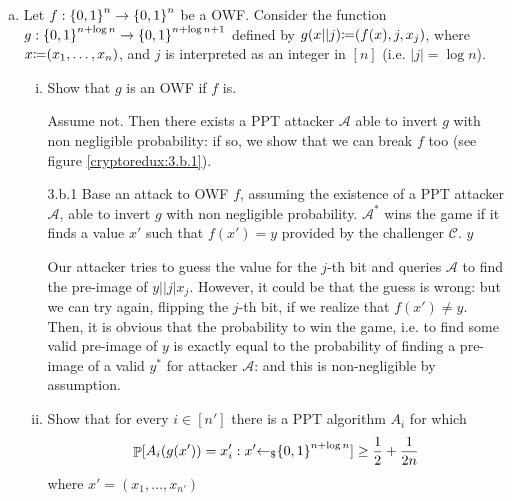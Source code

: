 \begin{enumerate}[(a)]
	\item Let $f: {\{0, 1\}}^n \to {\{0, 1\}}^n$ be a OWF. Consider the function $g: {\{0, 1\}}^{n + \log{n}} \to {\{0, 1\}}^{n + \log{n} + 1}$ defined by $g(x||j) {\coloneqq} (f(x), j, x_j)$, where $x {\coloneqq} (x_1, \dots, x_n)$, and $j$ is interpreted as an integer in $[n]$ (i.e. $|j| = \log n$).

	      \begin{enumerate}[(i)]
		      \item Show that $g$ is an OWF if $f$ is.

		            \begin{solution}
			            Assume not. Then there exists a PPT attacker $\mathcal{A}$ able to invert $g$ with non negligible probability: if so, we show that we can break $f$ too (see figure \ref{cryptoredux:3.b.1}).
			            \begin{cryptoredux}
				            {3.b.1}
				            {Base an attack to OWF $f$, assuming the existence of a PPT attacker $\mathcal{A}$, able to invert $g$ with non negligible probability. $\mathcal{A}^*$ wins the game if it finds a value $x'$ such that $f(x') = y$ provided by the challenger $\mathcal{C}$.}
				            {}
				            {}
				            {}
				            {$y$}{}
				            \cseqdelay
				            \cseqdelay
			            \end{cryptoredux}
			            Our attacker tries to guess the value for the $j$-th bit and queries $\mathcal{A}$ to find the pre-image of $y||j|x_j$. However, it could be that the guess is wrong: but we can try again, flipping the  $j$-th bit, if we realize that $f(x') \ne y$. Then, it is obvious that the probability to win the game, i.e. to find some valid pre-image of $y$ is exactly equal to the probability of finding a pre-image of a valid $y^*$ for attacker $\mathcal{A}$: and this is non-negligible by assumption.
		            \end{solution}

		      \item Show that for every $i \in [n']$ there is a PPT algorithm $A_i$ for which
		            \[ \mathop{\mathbb P}[A_i(g(x')) = x_i' : x' {\leftarrow_\$} {\{0, 1\}}^{n + \log{n}}] \ge \frac{1}{2} + \frac{1}{2n}\]
		            where $x' = (x_1, \dots, x_{n'})$


\end{enumerate}
\end{enumerate}

